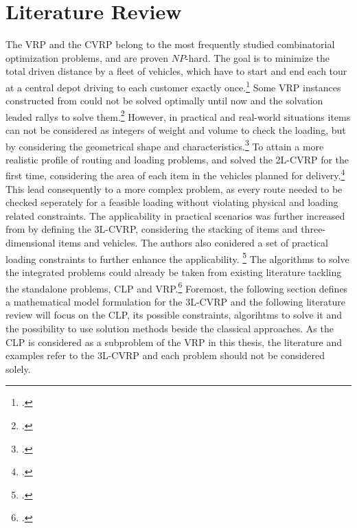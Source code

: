 \chapter{Literature Review}
\label{chap:literature_review}

The \gls{VRP} and the \gls{CVRP} belong to the most frequently studied combinatorial
optimization problems, and are proven $NP$-hard. The goal is to minimize the total driven distance
by a fleet of vehicles, which have to start and end each tour at a central depot driving to each
customer exactly once.\footcite[cf.][p.1]{gendreau_tabu_2008} Some \gls{VRP}
instances constructed from \cite{solomon_algorithms_1987} could not be solved optimally until now and the
solvation leaded rallys to solve them.\footcite[cf.][]{solomon_algorithms_1987} However,
in practical and real-world situations items can not be considered as integers of weight
and volume to check the loading, but by considering the geometrical shape and characteristics.\footcite[cf.][p.1]{gendreau_tabu_2008}
To attain a more realistic profile of routing and loading problems, \cite{iori_exact_2004} and \cite{gendreau_tabu_2008}
solved the \gls{2L-CVRP} for the first time, considering the area of each item in
the vehicles planned for delivery.\footcites(cf.)(){iori_exact_2004}{gendreau_tabu_2008}
This lead consequently to a more complex problem, as every route needed to be checked seperately for
a feasible loading without violating physical and loading related constraints.
The applicability in practical scenarios was further increased from \cite{gendreau_tabu_2006} by defining
the \gls{3L-CVRP}, considering the stacking of items and three-dimensional items and vehicles. The authors
also conidered a set of practical loading constraints to further enhance the applicability. \footcite[cf.][]{gendreau_tabu_2006}
The algorithms to solve the integrated problems could already be taken from existing literature tackling the standalone
problems, \gls{CLP} and \gls{VRP}.\footcite[cf.][]{pisinger_heuristics_2002} Foremost, the following section defines
a mathematical model formulation for the \gls{3L-CVRP} and the following literature review will focus
on the \gls{CLP}, its possible constraints, algorihtms to solve it and the possibility to use solution
methods beside the classical approaches. As the \gls{CLP} is considered as a subproblem of the \gls{VRP}
in this thesis, the literature and examples refer to the \gls{3L-CVRP} and each problem should not be
considered solely.



